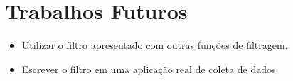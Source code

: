 



\section{Trabalhos Futuros}

\begin{itemize}
    \item Utilizar o filtro apresentado com outras funções de filtragem.
    \item Escrever o filtro em uma aplicação real de coleta de dados.
  \end{itemize}

